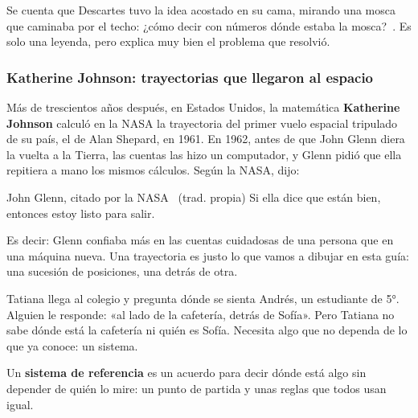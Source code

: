 \documentclass[11pt]{article}
\begin{document}
Se cuenta que Descartes tuvo la idea acostado en su cama, mirando una mosca que caminaba por el
techo: ¿cómo decir con números dónde estaba la mosca?~\cite{nrichmosca}. Es solo una leyenda,
pero explica muy bien el problema que resolvió.

\subsubsection*{Katherine Johnson: trayectorias que llegaron al espacio}

Más de trescientos años después, en Estados Unidos, la matemática \textbf{Katherine Johnson}
calculó en la NASA la trayectoria del primer vuelo espacial tripulado de su país, el de Alan
Shepard, en 1961. En 1962, antes de que John Glenn diera la vuelta a la Tierra, las cuentas las
hizo un computador, y Glenn pidió que ella repitiera a mano los mismos cálculos. Según la NASA,
dijo:

\begin{cita}{John Glenn, citado por la NASA~\cite{nasajohnson} (trad. propia)}
Si ella dice que están bien, entonces estoy listo para salir.
\end{cita}

Es decir: Glenn confiaba más en las cuentas cuidadosas de una persona que en una máquina nueva.
Una trayectoria es justo lo que vamos a dibujar en esta guía: una sucesión de posiciones, una
detrás de otra.

\label{tema:referencia}

\begin{hilo}
Tatiana llega al colegio y pregunta dónde se sienta Andrés, un estudiante de 5°. Alguien le
responde: «al lado de la cafetería, detrás de Sofía». Pero Tatiana no sabe dónde está la
cafetería ni quién es Sofía. Necesita algo que no dependa de lo que ya conoce: un sistema.
\end{hilo}

\begin{definicion}
Un \textbf{sistema de referencia} es un acuerdo para decir dónde está algo sin depender de
quién lo mire: un punto de partida y unas reglas que todos usan igual.
\end{definicion}
\end{document}
